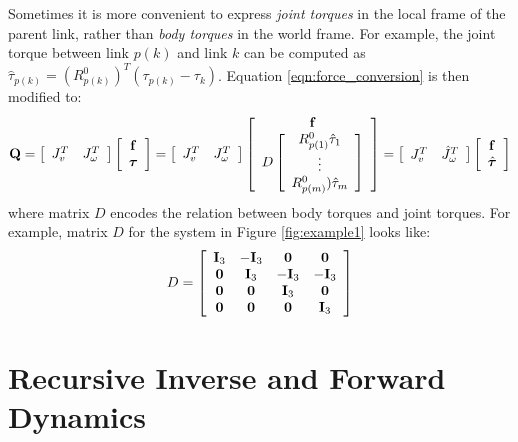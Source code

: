 Sometimes it is more convenient to express \emph{joint torques} in the
local frame of the parent link, rather than \emph{body torques} in the
world frame. For example, the joint torque between link $p(k)$ and
link $k$ can be computed as $\hat{\tau}_{p(k)} = (R^0_{p(k)})^T(\tau_{p(k)} -
\tau_k)$. Equation \ref{eqn:force_conversion} is then modified to:
\begin{equation}
\mathbf{Q} = \left[
\begin{array}{cc}
J_{v}^T & J_\omega^T
\end{array}
\right]
\left[
\begin{array}{c}
\mathbf{f} \\
\bm{\tau}
\end{array}
\right] 
 = \left[
\begin{array}{cc}
J_{v}^T & J_\omega^T
\end{array}
\right]
\left[
\begin{array}{c}
\mathbf{f} \\
D 
\left[
\begin{array}{c}
R^0_{p(1)} \hat{\tau}_1 \\
\vdots \\
R^0_{p(m)}) \hat{\tau}_m
\end{array}
\right]
\end{array}
\right] =
\left[
\begin{array}{cc}
J_{v}^T & \hat{J}_\omega^T
\end{array}
\right]
\left[
\begin{array}{c}
\mathbf{f} \\
\hat{\bm{\tau}}
\end{array}
\right]  
\end{equation}
where matrix $D$ encodes the relation between body torques and joint
torques. For example, matrix $D$ for the system in Figure \ref{fig:example1} looks
like:
\begin{equation}
D =
\left[
\begin{array}{cccc}
\vc{I}_{3\time 3}  & -\vc{I}_{3\time 3} & \vc{0} & \vc{0}\\
\vc{0} & \vc{I}_{3\time 3}  & -\vc{I}_{3\time 3} & -\vc{I}_{3\time 3}\\
\vc{0} & \vc{0} & \vc{I}_{3\time 3}  & \vc{0}\\
\vc{0} & \vc{0} & \vc{0} & \vc{I}_{3\time 3}\\
\end{array}
\right]  
\end{equation}


\section{Recursive Inverse and Forward Dynamics}